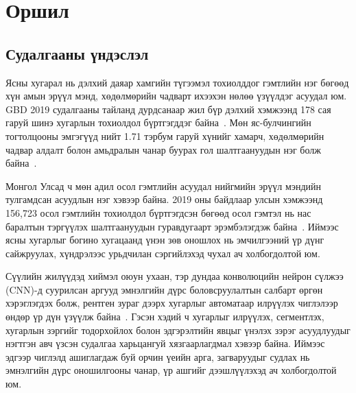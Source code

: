 
\chapter{Оршил}
\label{Chapter1}
\pagecolor{Beige}

\newcommand{\keyword}[1]{\textbf{#1}}
\newcommand{\tabhead}[1]{\textbf{#1}}
\newcommand{\code}[1]{\texttt{#1}}
\newcommand{\file}[1]{\texttt{\bfseries#1}}
\newcommand{\option}[1]{\texttt{\itshape#1}}


\section{Судалгааны үндэслэл}

Ясны хугарал нь дэлхий даяар хамгийн түгээмэл тохиолддог гэмтлийн нэг бөгөөд хүн амын эрүүл мэнд, хөдөлмөрийн чадварт ихээхэн нөлөө үзүүлдэг асуудал юм. GBD 2019 судалгааны тайланд дурдсанаар жил бүр дэлхий хэмжээнд 178 сая гаруй шинэ хугарлын тохиолдол бүртгэгддэг байна~\cite{ref01}. Мөн яс-булчингийн тогтолцооны эмгэгүүд нийт 1.71 тэрбум гаруй хүнийг хамарч, хөдөлмөрийн чадвар алдалт болон амьдралын чанар буурах гол шалтгаануудын нэг болж байна~\cite{ref02}.

Монгол Улсад ч мөн адил осол гэмтлийн асуудал нийгмийн эрүүл мэндийн тулгамдсан асуудлын нэг хэвээр байна. 2019 оны байдлаар улсын хэмжээнд 156{,}723 осол гэмтлийн тохиолдол бүртгэгдсэн бөгөөд осол гэмтэл нь нас баралтын тэргүүлэх шалтгаануудын гуравдугаарт эрэмбэлэгдэж байна~\cite{ref03,ref04}. Иймээс ясны хугарлыг богино хугацаанд үнэн зөв оношлох нь эмчилгээний үр дүнг сайжруулах, хүндрэлээс урьдчилан сэргийлэхэд чухал ач холбогдолтой юм.

Сүүлийн жилүүдэд хиймэл оюун ухаан, тэр дундаа конволюцийн нейрон сүлжээ (CNN)-д суурилсан аргууд эмнэлгийн дүрс боловсруулалтын салбарт өргөн хэрэглэгдэх болж, рентген зураг дээрх хугарлыг автоматаар илрүүлэх чиглэлээр өндөр үр дүн үзүүлж байна~\cite{ref08}. Гэсэн хэдий ч хугарлыг илрүүлэх, сегментлэх, хугарлын зэргийг тодорхойлох болон эдгэрэлтийн явцыг үнэлэх зэрэг асуудлуудыг нэгтгэн авч үзсэн судалгаа харьцангуй хязгаарлагдмал хэвээр байна. Иймээс эдгээр чиглэлд ашиглагдаж буй орчин үеийн арга, загваруудыг судлах нь эмнэлгийн дүрс оношилгооны чанар, үр ашгийг дээшлүүлэхэд ач холбогдолтой юм.


